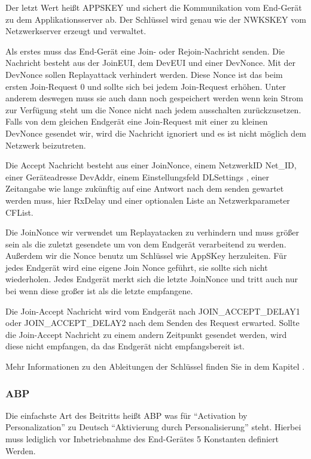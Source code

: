 \documentclass[a4paper,12pt]{article}
\begin{document}
                Der letzt Wert heißt APPSKEY und sichert die Kommunikation vom End-Gerät zu dem Applikationsserver ab. 
                Der Schlüssel wird genau wie der NWKSKEY vom Netzwerkserver erzeugt und verwaltet.\cite[S.3]{LoRaSecur}

                Als erstes muss das End-Gerät eine Join- oder Rejoin-Nachricht senden. Die Nachricht besteht aus der 
                JoinEUI, dem DevEUI und einer DevNonce. Mit der DevNonce sollen Replayattack verhindert werden. Diese 
                Nonce ist das beim ersten Join-Request 0 und sollte sich bei jedem Join-Request erhöhen. Unter anderem 
                deswegen muss sie auch dann noch gespeichert werden wenn kein Strom zur Verfügung steht um die Nonce 
                nicht nach jedem ausschalten zurückzusetzen. Falls von dem gleichen Endgerät eine Join-Request mit einer 
                zu kleinen DevNonce gesendet wir, wird die Nachricht ignoriert und es ist nicht möglich dem Netzwerk 
                beizutreten.

                Die Accept Nachricht besteht aus einer JoinNonce, einem NetzwerkID Net\_ID, einer Geräteadresse DevAddr,
                einem Einstellungsfeld DLSettings , einer Zeitangabe wie lange zukünftig auf eine Antwort nach dem
                senden gewartet werden muss, hier RxDelay und einer optionalen Liste an Netzwerkparameter CFList.

                Die JoinNonce wir verwendet um Replayatacken zu verhindern und muss größer sein als die zuletzt 
                gesendete um von dem Endgerät verarbeitend zu werden. Außerdem wir die Nonce benutz um Schlüssel wie 
                AppSKey herzuleiten. Für jedes Endgerät wird eine eigene Join Nonce geführt, sie sollte sich nicht 
                wiederholen. Jedes Endgerät merkt sich die letzte JoinNonce und tritt auch nur bei wenn diese großer 
                ist als die letzte empfangene.

                Die Join-Accept Nachricht wird vom Endgerät nach JOIN\_ACCEPT\_DELAY1 oder JOIN\_ACCEPT\_DELAY2 nach 
                dem Senden des Request erwarted. Sollte die Join-Accept Nachricht zu einem andern Zeitpunkt gesendet 
                werden, wird diese nicht empfangen, da das Endgerät nicht empfangsbereit ist.

                Mehr Informationen zu den Ableitungen der Schlüssel finden Sie in dem Kapitel .

            \subsubsection{ABP}
                Die einfachste Art des Beitritts heißt ABP was für ``Activation by Personalization'' zu Deutsch 
                ``Aktivierung durch Personalisierung'' steht. Hierbei muss lediglich vor Inbetriebnahme des 
                End-Gerätes 5 Konstanten definiert Werden. 
\end{document}
